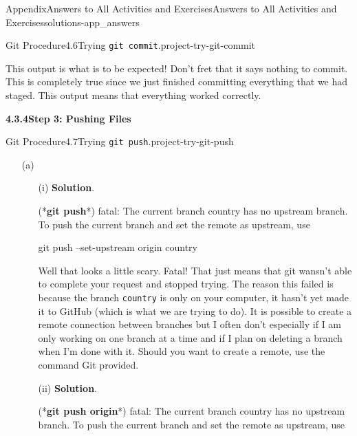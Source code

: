 \documentclass[twoside,10pt,]{book}
\newcommand{\blocktitlefont}{\relax}
\newcommand{\mono}[1]{\texttt{#1}}
\newcommand{\consoleinput}[1]{\textbf{#1}}
\begin{document}
\begin{solutions-chapter}{Appendix}{Answers to All Activities and Exercises}{}{Answers to All Activities and Exercises}{}{}{solutions-app_answers}
\begin{projectsolution}{Git Procedure}{4.6}{Trying \mono{git commit}.}{project-try-git-commit}
\begin{enumerate}[font=\bfseries,label=(\alph*),ref=\alph*]
This output is what is to be expected! Don't fret that it says nothing to commit. This is completely true since we just finished committing everything that we had staged. This output means that everything worked correctly.%
\end{enumerate}%
\end{projectsolution}%
\par\medskip
\noindent\textbf{\Large{}4.3.4\space\textperiodcentered\space{}Step 3: Pushing Files}
\begin{projectsolution}{Git Procedure}{4.7}{Trying \mono{git push}.}{project-try-git-push}%
\begin{enumerate}[font=\bfseries,label=(\alph*),ref=\alph*]%
\item[(a)]\begin{enumerate}[font=\bfseries,label=(\roman*),ref=\theenumi.\roman*]%
\item[(i)]\noindent\textbf{\blocktitlefont Solution}.\hypertarget{solution-try-git-push-c-b-b-back}{}\quad{}\begin{console}{0}{1}{0}
(*\consoleinput{git push}*)
fatal: The current branch country has no upstream branch.
To push the current branch and set the remote as upstream, use

    git push --set-upstream origin country
\end{console}
Well that looks a little scary. Fatal! That just means that git wansn't able to complete your request and stopped trying. The reason this failed is because the branch \mono{country} is only on your computer, it hasn't yet made it to GitHub (which is what we are trying to do). It is possible to create a remote connection between branches but I often don't especially if I am only working on one branch at a time and if I plan on deleting a branch when I'm done with it. Should you want to create a remote, use the command Git provided.%
\item[(ii)]\noindent\textbf{\blocktitlefont Solution}.\hypertarget{solution-try-git-push-c-c-b-back}{}\quad{}\begin{console}{0}{1}{0}
(*\consoleinput{git push origin}*)
fatal: The current branch country has no upstream branch.
To push the current branch and set the remote as upstream, use


\end{console}
\end{enumerate}
\end{enumerate}
\end{projectsolution}
\end{solutions-chapter}
\end{document}
